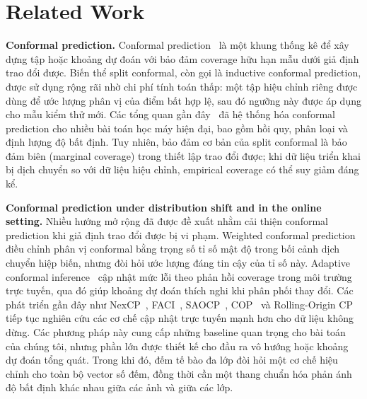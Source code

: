 \documentclass[pdflatex,sn-mathphys-num]{sn-jnl}
\begin{document}
\section{Related Work}\label{sec:related}

\textbf{Conformal prediction.}
Conformal prediction~\cite{vovk2005algorithmic} là một khung thống kê để xây dựng
tập hoặc khoảng dự đoán với bảo đảm coverage hữu hạn mẫu dưới giả định trao đổi được.
Biến thể split conformal, còn gọi là inductive conformal prediction, được sử dụng
rộng rãi nhờ chi phí tính toán thấp: một tập hiệu chỉnh riêng được dùng để ước lượng
phân vị của điểm bất hợp lệ, sau đó ngưỡng này được áp dụng cho mẫu kiểm thử mới.
Các tổng quan gần đây~\cite{angelopoulos2023gentle} đã hệ thống hóa conformal
prediction cho nhiều bài toán học máy hiện đại, bao gồm hồi quy, phân loại và định
lượng độ bất định. Tuy nhiên, bảo đảm cơ bản của split conformal là bảo đảm biên
(marginal coverage) trong thiết lập trao đổi được; khi dữ liệu triển khai bị dịch
chuyển so với dữ liệu hiệu chỉnh, empirical coverage có thể suy giảm đáng kể.

\textbf{Conformal prediction under distribution shift and in the online setting.}
Nhiều hướng mở rộng đã được đề xuất nhằm cải thiện conformal prediction khi giả định
trao đổi được bị vi phạm. Weighted conformal prediction~\cite{tibshirani2019conformal}
điều chỉnh phân vị conformal bằng trọng số tỉ số mật độ trong bối cảnh dịch chuyển
hiệp biến, nhưng đòi hỏi ước lượng đáng tin cậy của tỉ số này. Adaptive conformal
inference~\cite{gibbs2021adaptive} cập nhật mức lỗi theo phản hồi coverage trong
môi trường trực tuyến, qua đó giúp khoảng dự đoán thích nghi khi phân phối thay đổi.
Các phát triển gần đây như NexCP~\cite{barber2023conformal},
FACI~\cite{gibbs2024conformal}, SAOCP~\cite{bhatnagar2023improved},
COP~\cite{hu2026conformal} và Rolling-Origin CP~\cite{halkiewicz2026rolling} tiếp tục
nghiên cứu các cơ chế cập nhật trực tuyến mạnh hơn cho dữ liệu không dừng. Các phương
pháp này cung cấp những baseline quan trọng cho bài toán của chúng tôi, nhưng phần
lớn được thiết kế cho đầu ra vô hướng hoặc khoảng dự đoán tổng quát. Trong khi đó,
đếm tế bào đa lớp đòi hỏi một cơ chế hiệu chỉnh cho toàn bộ vector số đếm, đồng thời
cần một thang chuẩn hóa phản ánh độ bất định khác nhau giữa các ảnh và giữa các lớp.
\end{document}
